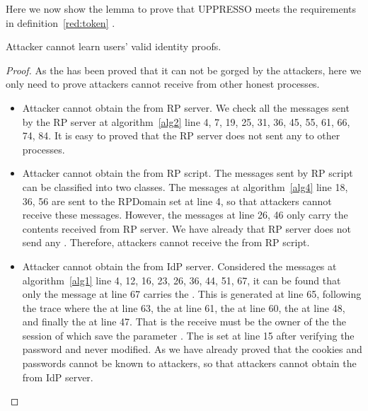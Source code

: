 \begin{appendices}
Here we now show the lemma to prove that UPPRESSO meets the requirements in definition~\ref{red:token} .
\begin{relemma}
Attacker cannot learn users' valid identity proofs.
\end{relemma}
\begin{proof}
As the  has been proved that it can not be gorged by the attackers, here we only need to prove attackers cannot receive  from other honest processes.
\begin{itemize}
\item Attacker cannot obtain the  from RP server.  We check all the messages sent by the RP server at algorithm~\ref{alg2} line 4, 7, 19, 25, 31, 36, 45, 55, 61, 66, 74, 84. It is easy to proved that the RP server does not sent any  to other processes.
\item Attacker cannot obtain the  from RP script. The  messages sent by RP script can be classified into two classes. The messages at algorithm~\ref{alg4} line 18, 36, 56 are sent to the RPDomain set at line 4, so that attackers cannot receive these messages. However, the messages at line 26,  46 only carry the contents received from RP server. We have already that RP server does not send any . Therefore, attackers cannot receive the  from RP script.
\item Attacker cannot obtain the  from IdP server.  Considered the messages at algorithm~\ref{alg1} line 4, 12, 16, 23, 26, 36, 44, 51, 67, it can be found that only the message at line 67 carries the . This  is generated at line 65, following the trace where the  at line 63, the  at line 61, the  at line 60, the  at line 48, and finally the  at line 47. That is the  receive must be the owner of the  the session of which save the parameter  . The  is set at line 15 after verifying the password and never modified. As we have already proved that the cookies and passwords cannot be known to attackers, so that attackers cannot obtain the  from IdP server.

\end{itemize}
\end{proof}
\end{appendices}
